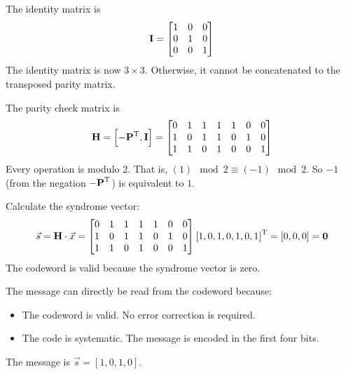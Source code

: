 \begin{solution}
\begin{tasks}
		The identity matrix is
		\begin{equation*}
			\bm{\mathrm{I}} = \left[\begin{matrix}
				1 & 0 & 0 \\
				0 & 1 & 0 \\
				0 & 0 & 1
			\end{matrix}\right]
		\end{equation*}
		The identity matrix is now $3 \times 3$. Otherwise, it cannot be concatenated to the transposed parity matrix.
	
		The parity check matrix is
		\begin{equation*}
			\bm{\mathrm{H}} = \left[-\bm{\mathrm{P}}^{\mathrm{T}}, \bm{\mathrm{\mathrm{I}}}\right] = \left[\begin{matrix}
				0 & 1 & 1 & 1 & 1 & 0 & 0 \\
				1 & 0 & 1 & 1 & 0 & 1 & 0 \\
				1 & 1 & 0 & 1 & 0 & 0 & 1
			\end{matrix}\right]
		\end{equation*}
		Every operation is modulo 2. That is, $(1) \mod 2 \equiv (-1) \mod 2$. So $-1$ (from the negation $-\bm{\mathrm{P}}^{\mathrm{T}}$) is equivalent to $1$.
		
		\task
		Calculate the syndrome vector:
		\begin{equation*}
			\vec{s} = \bm{\mathrm{H}} \cdot \vec{x} = \left[\begin{matrix}
				0 & 1 & 1 & 1 & 1 & 0 & 0 \\
				1 & 0 & 1 & 1 & 0 & 1 & 0 \\
				1 & 1 & 0 & 1 & 0 & 0 & 1
			\end{matrix}\right] \left[1, 0, 1, 0, 1, 0, 1\right]^{\mathrm{T}} = \left[0, 0, 0\right] = \bm{\mathrm{\mathrm{0}}}
		\end{equation*}
		The codeword is valid because the syndrome vector is zero.
		
		The message can directly be read from the codeword because:
		\begin{itemize}
			\item The codeword is valid. No error correction is required.
			\item The code is systematic. The message is encoded in the first four bits.
		\end{itemize}
		The message is $\vec{s} = \left[1, 0, 1, 0\right]$.
	\end{tasks}
\end{solution}

%	
%
%	

